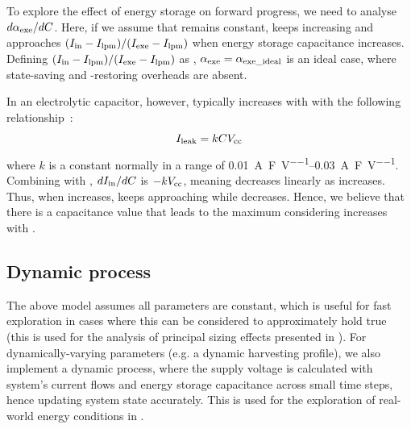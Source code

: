 To explore the effect of energy storage on forward progress, we need to analyse $d\alpha_{\text{exe}} / dC$. 
Here, if we assume that  remains constant,  keeps increasing and approaches $(I_{\text{in}} - I_{\text{lpm}}) / (I_{\text{exe}} - I_{\text{lpm}})$ when energy storage capacitance  increases. 
Defining $(I_{\text{in}} - I_{\text{lpm}}) / (I_{\text{exe}} - I_{\text{lpm}})$ as , $\alpha_{\text{exe}} = \alpha_{\text{exe\_ideal}}$ is an ideal case, where state-saving and -restoring overheads are absent.

In an electrolytic capacitor, however,  typically increases with  with the following relationship~\cite{avxleakage}:
\begin{equation}
    I_{\text{leak}} = kCV_{\text{cc}}
    \label{eq:ileak}
\end{equation}
where $k$ is a constant normally in a range of \SIrange{0.01}{0.03}{\ampere\per\farad\per\volt}. 
Combining  with , $dI_{\text{in}} / dC$ is $-kV_{\text{cc}}$, meaning  decreases linearly as  increases. 
Thus, when  increases,  keeps approaching  while  decreases. 
Hence, we believe that there is a capacitance value that leads to the maximum  considering  increases with .

\subsection{Dynamic process}

The above model assumes all parameters are constant, which is useful for fast exploration in cases where this can be considered to approximately hold true (this is used for the analysis of principal sizing effects presented in ).
For dynamically-varying parameters (e.g. a dynamic harvesting profile), we also implement a dynamic process, where the supply voltage is calculated with system's current flows and energy storage capacitance across small time steps, hence updating system state accurately. 
This is used for the exploration of real-world energy conditions in .
